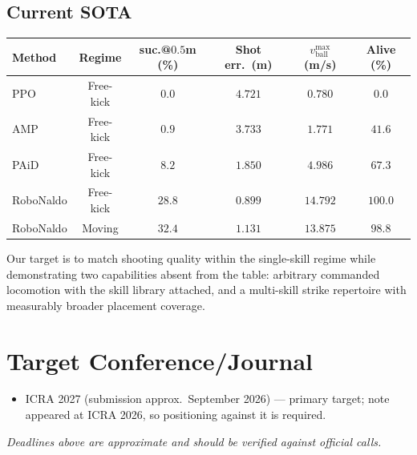 \documentclass{article}
\begin{document}
\subsection{Current SOTA}
\begin{table}[H]
\centering
\begin{tabular}{lccccc}
\toprule
Method & Regime & suc.@$0.5$m (\%) & Shot err.\ (m) & $v^{\max}_{\mathrm{ball}}$ (m/s) & Alive (\%) \\
\midrule
PPO \citep{ppo}          & Free-kick & $0.0$  & $4.721$ & $0.780$  & $0.0$ \\
AMP \citep{amp}          & Free-kick & $0.9$  & $3.733$ & $1.771$  & $41.6$ \\
PAiD \citep{paid}        & Free-kick & $8.2$  & $1.850$ & $4.986$  & $67.3$ \\
RoboNaldo \citep{robonaldo} & Free-kick & $\mathbf{28.8}$ & $\mathbf{0.899}$ & $\mathbf{14.792}$ & $\mathbf{100.0}$ \\
RoboNaldo \citep{robonaldo} & Moving    & $32.4$ & $1.131$ & $13.875$ & $98.8$ \\
\bottomrule
\end{tabular}
\end{table}

Our target is to match shooting quality within the single-skill regime while demonstrating two capabilities absent from the table: arbitrary commanded locomotion with the skill library attached, and a multi-skill strike repertoire with measurably broader placement coverage.

\section{Target Conference/Journal}
\begin{itemize}
  \item ICRA 2027 (submission approx.\ September 2026) --- primary target; note \citet{striker} appeared at ICRA 2026, so positioning against it is required.
\end{itemize}
\emph{Deadlines above are approximate and should be verified against official calls.}
\end{document}
